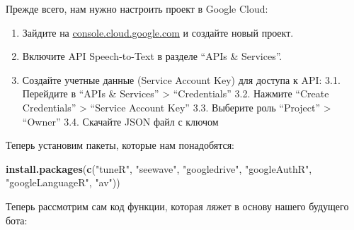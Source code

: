 \documentclass[
]{book}
\newenvironment{Shaded}{\begin{snugshade}}{\end{snugshade}}
\newcommand{\FunctionTok}[1]{\textcolor[rgb]{0.13,0.29,0.53}{\textbf{#1}}}
\newcommand{\NormalTok}[1]{#1}
\newcommand{\StringTok}[1]{\textcolor[rgb]{0.31,0.60,0.02}{#1}}
\providecommand{\tightlist}{%
  \setlength{\itemsep}{0pt}\setlength{\parskip}{0pt}}
\begin{document}
Прежде всего, нам нужно настроить проект в Google Cloud:

\begin{enumerate}
\def\labelenumi{\arabic{enumi}.}
\tightlist
\item
  Зайдите на \href{https://console.cloud.google.com/}{console.cloud.google.com} и создайте новый проект.
\item
  Включите API Speech-to-Text в разделе ``APIs \& Services''.
\item
  Создайте учетные данные (Service Account Key) для доступа к API:
  3.1. Перейдите в ``APIs \& Services'' \textgreater{} ``Credentials''
  3.2. Нажмите ``Create Credentials'' \textgreater{} ``Service Account Key''
  3.3. Выберите роль ``Project'' \textgreater{} ``Owner''
  3.4. Скачайте JSON файл с ключом
\end{enumerate}

Теперь установим пакеты, которые нам понадобятся:

\begin{Shaded}
\begin{Highlighting}[]
\FunctionTok{install.packages}\NormalTok{(}\FunctionTok{c}\NormalTok{(}\StringTok{"tuneR"}\NormalTok{, }\StringTok{"seewave"}\NormalTok{, }\StringTok{"googledrive"}\NormalTok{, }\StringTok{"googleAuthR"}\NormalTok{, }\StringTok{"googleLanguageR"}\NormalTok{, }\StringTok{"av"}\NormalTok{))}
\end{Highlighting}
\end{Shaded}

Теперь рассмотрим сам код функции, которая ляжет в основу нашего будущего бота:
\end{document}
